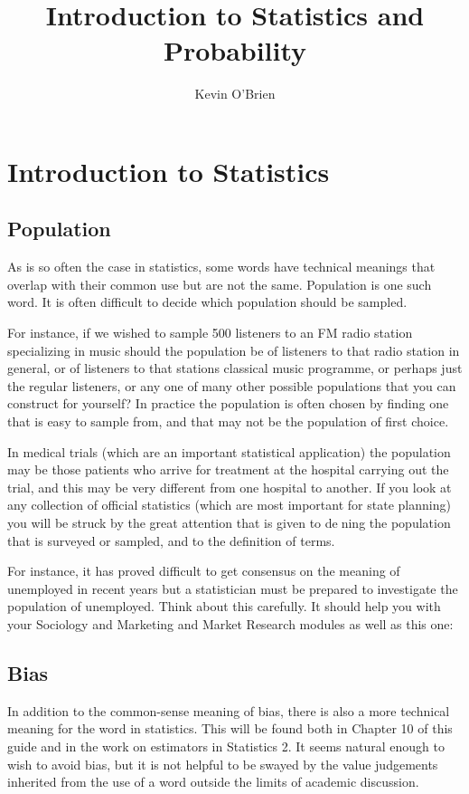 \documentclass[12pt]{article}
\title{Introduction to Statistics and Probability}
\author{Kevin O'Brien}
\begin{document}
\maketitle
\newpage
\tableofcontents


\newpage
\section{Introduction to Statistics}
\subsection{Population}
As is so often the case in statistics, some words have technical meanings that overlap with their common use but are not the same. Population is one such word. It is often difficult to decide which population should be sampled. 

For instance, if we wished to sample 500 listeners to an FM radio station specializing in music should the population be of listeners to that radio station in general, or of listeners to that stations classical music programme, or perhaps just the regular listeners, or any one of many other possible populations that you can construct for yourself? In practice the population is often chosen by finding one that is easy to sample from, and that may not be the population of first choice.


In medical trials (which are an important statistical application) the population may be those patients who arrive for treatment at the hospital carrying out the trial, and this may be very different from one hospital to another. If you look at any collection of official statistics (which
are most important for state planning) you will be struck by the great attention that is given to dening the population that is surveyed or sampled, and to the definition of terms. 

For instance, it has proved difficult to get consensus on the meaning of unemployed in recent years but a statistician must be prepared to investigate the population of unemployed. Think about this carefully.
It should help you with your Sociology and Marketing and Market Research modules as well as
this one:
\subsection{Bias}
In addition to the common-sense meaning of bias, there is also a more technical meaning for the
word in statistics. This will be found both in Chapter 10 of this guide and in the work on estimators
in Statistics 2. It seems natural enough to wish to avoid bias, but it is not helpful to be swayed by
the value judgements inherited from the use of a word outside the limits of academic discussion.
\end{document}
